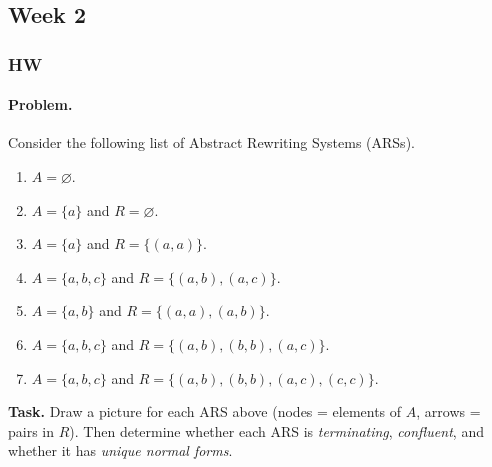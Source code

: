 \documentclass{article}
\theoremstyle{theorem}
\theoremstyle{definition}
\theoremstyle{remark}
\begin{document}
\subsection{Week 2}
\subsubsection{HW}

\paragraph{Problem.}
Consider the following list of Abstract Rewriting Systems (ARSs).
\begin{enumerate}
  \item $A=\varnothing$.
  \item $A=\{a\}$ \; and \; $R=\varnothing$.
  \item $A=\{a\}$ \; and \; $R=\{(a,a)\}$.
  \item $A=\{a,b,c\}$ \; and \; $R=\{(a,b),(a,c)\}$.
  \item $A=\{a,b\}$ \; and \; $R=\{(a,a),(a,b)\}$.
  \item $A=\{a,b,c\}$ \; and \; $R=\{(a,b),(b,b),(a,c)\}$.
  \item $A=\{a,b,c\}$ \; and \; $R=\{(a,b),(b,b),(a,c),(c,c)\}$.
\end{enumerate}

\noindent\textbf{Task.} Draw a picture for each ARS above (nodes = elements of $A$, arrows = pairs in $R$).
Then determine whether each ARS is \emph{terminating}, \emph{confluent}, and whether it has \emph{unique normal forms}.


\medskip

\begin{center}
\end{center}

\begin{center}
\end{center}
\end{document}
